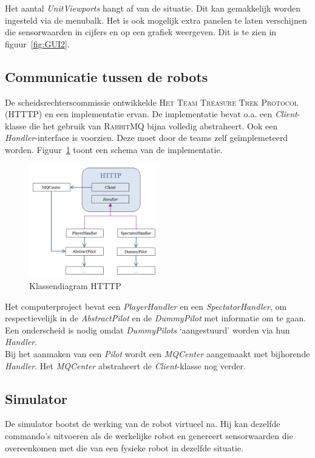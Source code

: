\documentclass[eind]{penoverslag}
\begin{document}
Het aantal \textit{UnitViewports} hangt af van de situatie. Dit kan gemakkelijk worden ingesteld via de menubalk. Het is ook mogelijk extra panelen te laten verschijnen die sensorwaarden in cijfers en op een grafiek weergeven. Dit is te zien in figuur~\ref{fig:GUI2}.

\subsection{Communicatie tussen de robots}
\label{ssec:RabbMQ}
De scheidsrechterscommissie ontwikkelde \textsc{Het Team Treasure Trek Protocol (HTTTP)} en een implementatie ervan. De implementatie bevat o.a. een \textit{Client}-klasse die het gebruik van \textsc{RabbitMQ} bijna volledig abstraheert. Ook een \textit{Handler}-interface is voorzien. Deze moet door de teams zelf ge\"implemeteerd worden. Figuur~\ref{fig:klasHTTTP} toont een schema van de implementatie.\\

\begin{figure}[h]
\centering
	\includegraphics[width=0.5\textwidth]{KlasHTTTP}
\caption{Klassendiagram HTTTP}
\label{fig:klasHTTTP}
\end{figure}

Het computerproject bevat een \textit{PlayerHandler} en een \textit{SpectatorHandler}, om respectievelijk in de \textit{AbstractPilot} en de \textit{DummyPilot} met informatie om te gaan. Een onderscheid is nodig omdat \textit{DummyPilots} `aangestuurd' worden via hun \textit{Handler}.\\

Bij het aanmaken van een \textit{Pilot} wordt een \textit{MQCenter} aangemaakt met bijhorende \textit{Handler}. Het \textit{MQCenter} abstraheert de \textit{Client}-klasse nog verder.



\subsection{Simulator} 
\label{ssec:Sim}
De simulator bootst de werking van de robot virtueel na. Hij kan dezelfde commando's uitvoeren als de werkelijke robot en genereert sensorwaarden die overeenkomen met die van een fysieke robot in dezelfde situatie.
\end{document}
